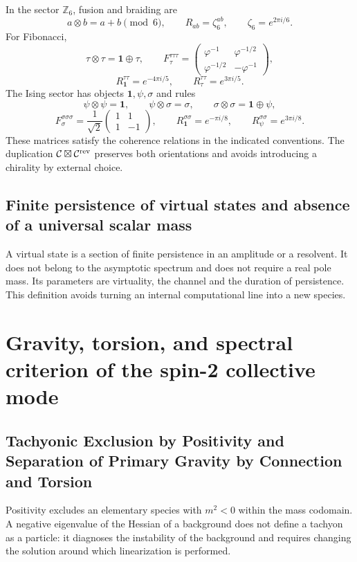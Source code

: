 In the sector \(\mathbb Z_6\), fusion and braiding are
\[
 a\otimes b=a+b\pmod 6,
 \qquad
 R_{ab}=\zeta_6^{ab},
 \qquad \zeta_6=e^{2\pi i/6}.
\]
For Fibonacci,
\[
 \tau\otimes\tau=\mathbf 1\oplus\tau,
 \qquad
 F_\tau^{\tau\tau\tau}=
 \begin{pmatrix}
 \varphi^{-1}&\varphi^{-1/2}\\
 \varphi^{-1/2}&-\varphi^{-1}
 \end{pmatrix},
\]
\[
 R_{\mathbf1}^{\tau\tau}=e^{-4\pi i/5},
 \qquad
 R_\tau^{\tau\tau}=e^{3\pi i/5}.
\]
The Ising sector has objects \(\mathbf1,\psi,\sigma\) and rules
\[
 \psi\otimes\psi=\mathbf1,
 \qquad
 \psi\otimes\sigma=\sigma,
 \qquad
 \sigma\otimes\sigma=\mathbf1\oplus\psi,
\]
\[
 F_\sigma^{\sigma\sigma\sigma}
 =\frac1{\sqrt2}
 \begin{pmatrix}1&1\\1&-1\end{pmatrix},
 \qquad
 R_{\mathbf1}^{\sigma\sigma}=e^{-\pi i/8},
 \qquad
 R_\psi^{\sigma\sigma}=e^{3\pi i/8}.
\]
These matrices satisfy the coherence relations in the indicated
conventions. The duplication
\(\mathcal C\boxtimes\mathcal C^{\rm rev}\) preserves both orientations and
avoids introducing a chirality by external choice.

\subsection{Finite persistence of virtual states and absence of a universal scalar mass}

A virtual state is a section of finite persistence in an amplitude or a
resolvent. It does not belong to the asymptotic spectrum and does not require a real pole
mass. Its parameters are virtuality, the channel and the duration of
persistence. This definition avoids turning an internal computational line into
a new species.

\section{Gravity, torsion, and spectral criterion of the spin-2 collective mode}

\subsection{Tachyonic Exclusion by Positivity and Separation of Primary Gravity by Connection and Torsion}

Positivity excludes an elementary species with \(m^2<0\) within the
mass codomain. A negative eigenvalue of the Hessian of a background does not define a
tachyon as a particle: it diagnoses the instability of the background and requires changing
the solution around which linearization is performed.

